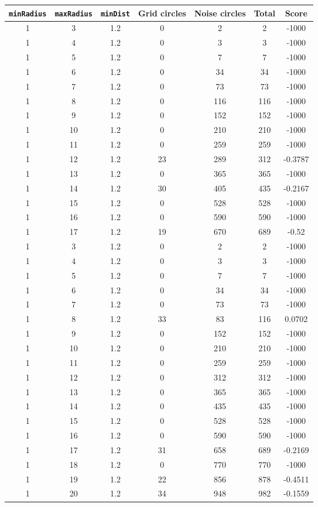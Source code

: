 \documentclass[letterpaper, 12pt]{article}
\begin{document}
\begin{longtable}{|c|c|c|c|c|c|c|}
\hline
\textbf{\texttt{minRadius}} & \textbf{\texttt{maxRadius}} & \textbf{\texttt{minDist}} & \textbf{Grid circles} & \textbf{Noise circles} & \textbf{Total} & \textbf{Score} \\
\hline
1 & 3 & 1.2 & 0 & 2 & 2 & -1000 \\
\hline
1 & 4 & 1.2 & 0 & 3 & 3 & -1000 \\
\hline
1 & 5 & 1.2 & 0 & 7 & 7 & -1000 \\
\hline
1 & 6 & 1.2 & 0 & 34 & 34 & -1000 \\
\hline
1 & 7 & 1.2 & 0 & 73 & 73 & -1000 \\
\hline
1 & 8 & 1.2 & 0 & 116 & 116 & -1000 \\
\hline
1 & 9 & 1.2 & 0 & 152 & 152 & -1000 \\
\hline
1 & 10 & 1.2 & 0 & 210 & 210 & -1000 \\
\hline
1 & 11 & 1.2 & 0 & 259 & 259 & -1000 \\
\hline
1 & 12 & 1.2 & 23 & 289 & 312 & -0.3787 \\
\hline
1 & 13 & 1.2 & 0 & 365 & 365 & -1000 \\
\hline
1 & 14 & 1.2 & 30 & 405 & 435 & -0.2167 \\
\hline
1 & 15 & 1.2 & 0 & 528 & 528 & -1000 \\
\hline
1 & 16 & 1.2 & 0 & 590 & 590 & -1000 \\
\hline
1 & 17 & 1.2 & 19 & 670 & 689 & -0.52 \\
\hline
1 & 3 & 1.2 & 0 & 2 & 2 & -1000 \\
\hline
1 & 4 & 1.2 & 0 & 3 & 3 & -1000 \\
\hline
1 & 5 & 1.2 & 0 & 7 & 7 & -1000 \\
\hline
1 & 6 & 1.2 & 0 & 34 & 34 & -1000 \\
\hline
1 & 7 & 1.2 & 0 & 73 & 73 & -1000 \\
\hline
1 & 8 & 1.2 & 33 & 83 & 116 & 0.0702 \\
\hline
1 & 9 & 1.2 & 0 & 152 & 152 & -1000 \\
\hline
1 & 10 & 1.2 & 0 & 210 & 210 & -1000 \\
\hline
1 & 11 & 1.2 & 0 & 259 & 259 & -1000 \\
\hline
1 & 12 & 1.2 & 0 & 312 & 312 & -1000 \\
\hline
1 & 13 & 1.2 & 0 & 365 & 365 & -1000 \\
\hline
1 & 14 & 1.2 & 0 & 435 & 435 & -1000 \\
\hline
1 & 15 & 1.2 & 0 & 528 & 528 & -1000 \\
\hline
1 & 16 & 1.2 & 0 & 590 & 590 & -1000 \\
\hline
1 & 17 & 1.2 & 31 & 658 & 689 & -0.2169 \\
\hline
1 & 18 & 1.2 & 0 & 770 & 770 & -1000 \\
\hline
1 & 19 & 1.2 & 22 & 856 & 878 & -0.4511 \\
\hline
1 & 20 & 1.2 & 34 & 948 & 982 & -0.1559 \\
\hline
\end{longtable}
\end{document}
